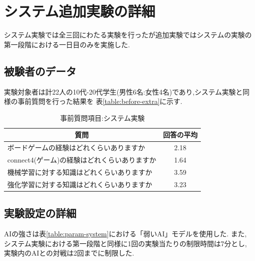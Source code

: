 \chapter{システム追加実験の詳細}
\label{chap:system}
システム実験では全三回にわたる実験を行ったが追加実験ではシステムの実験の第一段階における一日目のみを実施した.
\section{被験者のデータ}
実験対象者は計22人の10代-20代学生(男性6名:女性4名)であり,システム実験と同様の事前質問を行った結果を
表\ref{table:before-extra}に示す.


\begin{table}[H]
    \caption{事前質問項目:システム実験}
    \label{table:before}
	\scriptsize
    \begin{tabular}{l||c}
        \multicolumn{1}{c|}{質問} & 回答の平均\\ \hline \hline
        ボードゲームの経験はどれくらいありますか & 2.18\\
        connect4(ゲーム)の経験はどれくらいありますか& 1.64\\\hline
        機械学習に対する知識はどれくらいありますか& 3.59\\
        強化学習に対する知識はどれくらいありますか& 3.23\\
    \end{tabular}
    
\end{table}
\section{実験設定の詳細}
AIの強さは表\ref{table:param-system}における「弱いAI」モデルを使用した.
また,システム実験における第一段階と同様に1回の実験当たりの制限時間は7分とし,実験内のAIとの対戦は2回までに制限した.

